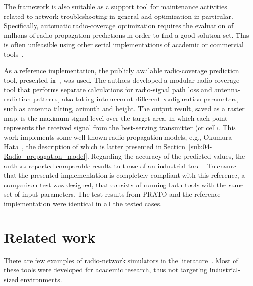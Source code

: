 The framework is also suitable as a support tool for maintenance activities
related to network troubleshooting in general and optimization in
particular. Specifically, automatic radio-coverage optimization requires
the evaluation of millions of radio-propagation predictions in order
to find a good solution set. This is often unfeasible using other
serial implementations of academic or commercial tools~\cite{Ozimek_Open.source.radio.coverage.prediction:2010,Mehlfuhrer_The_Vienna_LTE_Simulators_enabling_reproducibility_in_wireless_communications_research:2011,Piro_Simulating_LTE_cellular_systems_an_open_source_framework:2011}.

As a reference implementation, the publicly available radio-coverage
prediction tool, presented in~\cite{Ozimek_Open.source.radio.coverage.prediction:2010},
was used. The authors developed a modular radio-coverage tool that
performs separate calculations for radio-signal path loss and antenna-radiation
patterns, also taking into account different configuration parameters,
such as antenna tilting, azimuth and height. The output result, saved
as a raster map, is the maximum signal level over the target area,
in which each point represents the received signal from the best-serving
transmitter (or cell). This work implements some well-known radio-propagation
models, e.g., Okumura-Hata~\cite{Hata_Empirical_formula_for_propagation_loss_in_land_mobile_radio_services:1980},
the description of which is latter presented in Section~\ref{sub:04-Radio_propagation_model}.
Regarding the accuracy of the predicted values, the authors reported
comparable results to those of an industrial tool~\cite{Ozimek_Open.source.radio.coverage.prediction:2010}.
To ensure that the presented implementation is completely compliant
with this reference, a comparison test was designed, that consists
of running both tools with the same set of input parameters. The test
results from PRATO and the reference implementation were identical
in all the tested cases.






\section{Related work \label{sec:04-Related_work}}

There are few examples of radio-network simulators in the literature~\cite{Ozimek_Open.source.radio.coverage.prediction:2010,Mehlfuhrer_The_Vienna_LTE_Simulators_enabling_reproducibility_in_wireless_communications_research:2011,Pillekeit-A_hybrid_simulation_framework_for_the_evaluation_of_common_RRM:2012,Piro_Simulating_LTE_cellular_systems_an_open_source_framework:2011,Sanchez_Performance_evaluation_of_OFDMA_wireless_systems_using_WM_SIM:2006,Yeung-Detailed_OFDM_modeling_in_network_simulation:2004}.
Most of these tools were developed for academic research, thus not
targeting industrial-sized environments. 

